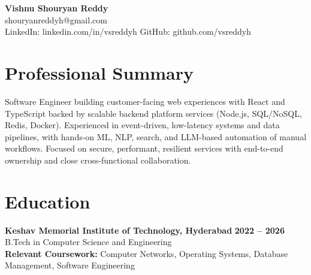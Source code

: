 \documentclass[a4paper,11pt]{article}
\newcommand{\resumeSubheading}[4]{%
  \textbf{#1} \hfill \textbf{#2} \\
{#3} \hfill {#4}
}
\begin{document}
\pagestyle{empty}
\raggedbottom
\addtolength{\textheight}{2\baselineskip}
\small

\begin{center}
  {\LARGE \textbf{Vishnu Shouryan Reddy}}\\[0.3em]
  shouryanreddyh@gmail.com \\[0.3em]
  LinkedIn: linkedin.com/in/vsreddyh \textbar{} GitHub: github.com/vsreddyh
\end{center}
\vspace{-0.8em}

\section*{Professional Summary}

Software Engineer building customer-facing web experiences with React and TypeScript backed by scalable backend platform services (Node.js, SQL/NoSQL, Redis, Docker). Experienced in event-driven, low-latency systems and data pipelines, with hands-on ML, NLP, search, and LLM-based automation of manual workflows. Focused on secure, performant, resilient services with end-to-end ownership and close cross-functional collaboration.

\section*{Education}

\resumeSubheading
{Keshav Memorial Institute of Technology, Hyderabad}{2022 -- 2026}
{B.Tech in Computer Science and Engineering}{} \\
\textbf{Relevant Coursework:} Computer Networks, Operating Systems, Database Management, Software Engineering


\end{document}
